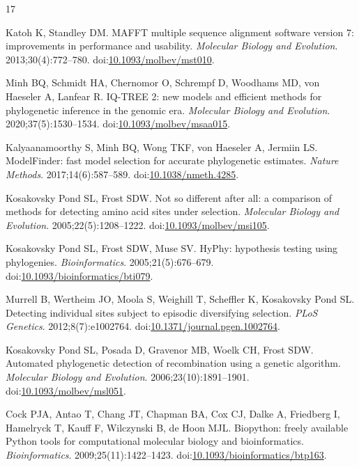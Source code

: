 \documentclass[11pt]{article}
\begin{document}
\bigskip
\begin{thebibliography}{17}

Katoh K, Standley DM. MAFFT multiple sequence alignment software version 7: improvements in performance and usability. \emph{Molecular Biology and Evolution}. 2013;30(4):772--780. doi:\href{https://doi.org/10.1093/molbev/mst010}{10.1093/molbev/mst010}.

Minh BQ, Schmidt HA, Chernomor O, Schrempf D, Woodhams MD, von Haeseler A, Lanfear R. IQ-TREE 2: new models and efficient methods for phylogenetic inference in the genomic era. \emph{Molecular Biology and Evolution}. 2020;37(5):1530--1534. doi:\href{https://doi.org/10.1093/molbev/msaa015}{10.1093/molbev/msaa015}.

Kalyaanamoorthy S, Minh BQ, Wong TKF, von Haeseler A, Jermiin LS. ModelFinder: fast model selection for accurate phylogenetic estimates. \emph{Nature Methods}. 2017;14(6):587--589. doi:\href{https://doi.org/10.1038/nmeth.4285}{10.1038/nmeth.4285}.

Kosakovsky Pond SL, Frost SDW. Not so different after all: a comparison of methods for detecting amino acid sites under selection. \emph{Molecular Biology and Evolution}. 2005;22(5):1208--1222. doi:\href{https://doi.org/10.1093/molbev/msi105}{10.1093/molbev/msi105}.

Kosakovsky Pond SL, Frost SDW, Muse SV. HyPhy: hypothesis testing using phylogenies. \emph{Bioinformatics}. 2005;21(5):676--679. doi:\href{https://doi.org/10.1093/bioinformatics/bti079}{10.1093/bioinformatics/bti079}.

Murrell B, Wertheim JO, Moola S, Weighill T, Scheffler K, Kosakovsky Pond SL. Detecting individual sites subject to episodic diversifying selection. \emph{PLoS Genetics}. 2012;8(7):e1002764. doi:\href{https://doi.org/10.1371/journal.pgen.1002764}{10.1371/journal.pgen.1002764}.

Kosakovsky Pond SL, Posada D, Gravenor MB, Woelk CH, Frost SDW. Automated phylogenetic detection of recombination using a genetic algorithm. \emph{Molecular Biology and Evolution}. 2006;23(10):1891--1901. doi:\href{https://doi.org/10.1093/molbev/msl051}{10.1093/molbev/msl051}.

Cock PJA, Antao T, Chang JT, Chapman BA, Cox CJ, Dalke A, Friedberg I, Hamelryck T, Kauff F, Wilczynski B, de Hoon MJL. Biopython: freely available Python tools for computational molecular biology and bioinformatics. \emph{Bioinformatics}. 2009;25(11):1422--1423. doi:\href{https://doi.org/10.1093/bioinformatics/btp163}{10.1093/bioinformatics/btp163}.


\end{thebibliography}
\end{document}
